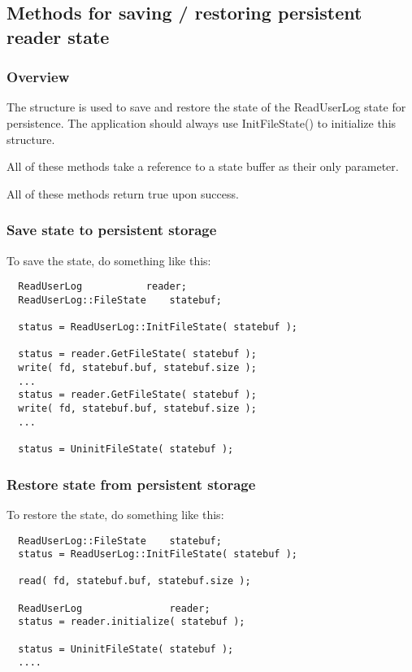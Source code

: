 \subsection{Methods for saving / restoring persistent reader state}
\subsubsection{Overview}
The  structure is used to save and
restore the state of the ReadUserLog state for persistence.  The
application should always use InitFileState() to initialize this
structure.

All of these methods take a reference to a state buffer
as their only parameter.

All of these methods return true upon success.

\subsubsection{Save state to persistent storage}
To save the state, do something like this:
\begin{verbatim}
  ReadUserLog			reader;
  ReadUserLog::FileState	statebuf;

  status = ReadUserLog::InitFileState( statebuf );

  status = reader.GetFileState( statebuf );
  write( fd, statebuf.buf, statebuf.size );
  ...
  status = reader.GetFileState( statebuf );
  write( fd, statebuf.buf, statebuf.size );
  ...

  status = UninitFileState( statebuf );
\end{verbatim}

\subsubsection{Restore state from persistent storage}
To restore the state, do something like this:
\begin{verbatim}
  ReadUserLog::FileState	statebuf;
  status = ReadUserLog::InitFileState( statebuf );

  read( fd, statebuf.buf, statebuf.size );

  ReadUserLog  				reader;
  status = reader.initialize( statebuf );

  status = UninitFileState( statebuf );
  ....
\end{verbatim}

